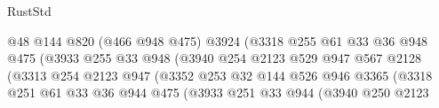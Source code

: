 \begin{lexlean}{RustStd}
\begin{coremodule}
{\begin{coremodule}
{{{{{{{{{{{{                                          @48
                                          @144
                                          @820
                                          (@466 @948 @475)
                                          @3924
                                          (@3318
                                            @255
                                            @61
                                            @33
                                            @36
                                            @948
                                            @475
                                            (@3933
                                              @255
                                              @33
                                              @948
                                              (@3940
                                                @254
                                                @2123
                                                @529
                                                @947
                                                @567
                                                @2128
                                                (@3313
                                                  @254
                                                  @2123
                                                  @947
                                                  (@3352
                                                    @253
                                                    @32
                                                    @144
                                                    @526
                                                    @946
                                                    @3365
                                                    (@3318
                                                      @251
                                                      @61
                                                      @33
                                                      @36
                                                      @944
                                                      @475
                                                      (@3933
                                                        @251
                                                        @33
                                                        @944
                                                        (@3940
                                                          @250
                                                          @2123
}}}}}}}}}}}}
\end{coremodule}}
\end{coremodule}
\end{lexlean}
